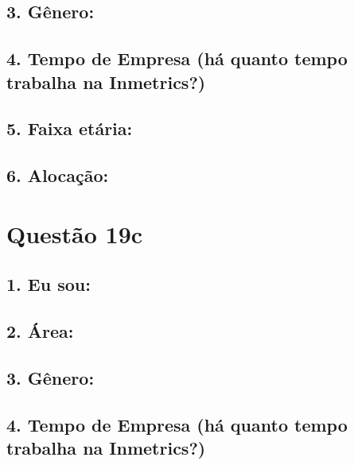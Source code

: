 \documentclass[]{book}
\begin{document}
\hypertarget{genero-46}{%
\subsection{3. Gênero:}\label{genero-46}}

\hypertarget{tempo-de-empresa-ha-quanto-tempo-trabalha-na-inmetrics-46}{%
\subsection{4. Tempo de Empresa (há quanto tempo trabalha na Inmetrics?)}\label{tempo-de-empresa-ha-quanto-tempo-trabalha-na-inmetrics-46}}

\hypertarget{faixa-etaria-46}{%
\subsection{5. Faixa etária:}\label{faixa-etaria-46}}

\hypertarget{alocacao-46}{%
\subsection{6. Alocação:}\label{alocacao-46}}

\hypertarget{questao-19c}{%
\section{Questão 19c}\label{questao-19c}}

\hypertarget{eu-sou-47}{%
\subsection{1. Eu sou:}\label{eu-sou-47}}

\hypertarget{area-47}{%
\subsection{2. Área:}\label{area-47}}

\hypertarget{genero-47}{%
\subsection{3. Gênero:}\label{genero-47}}

\hypertarget{tempo-de-empresa-ha-quanto-tempo-trabalha-na-inmetrics-47}{%
\subsection{4. Tempo de Empresa (há quanto tempo trabalha na Inmetrics?)}\label{tempo-de-empresa-ha-quanto-tempo-trabalha-na-inmetrics-47}}
\end{document}
